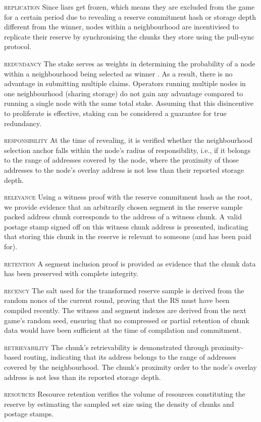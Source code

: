 \begin{labelledlist}
    \item[\textsc{replication}] Since liars get frozen, which means they are excluded from the game for a certain period due to revealing a reserve commitment hash or storage depth different from the winner, nodes within a neighbourhood are incentivised to replicate their reserve by synchronising the chunks they store using the pull-sync protocol.
%
\item[\textsc{redundancy}] The stake serves as weights in determining the probability of a node within a neighbourhood being selected as winner%
. As a result, there is no advantage in submitting multiple claims. Operators running multiple nodes in one neighbourhood (sharing storage) do not gain any advantage compared to running a single node with the same total stake. Assuming that this disincentive to proliferate is effective, staking can be considered a guarantee for true redundancy.
%
\item[\textsc{responsibility}]   At the time of revealing, it is verified whether the neighbourhood selection anchor falls within the node's radius of responsibility, i.e., if it belongs to the range of addresses covered by the node, where the proximity of those addresses to the node's overlay address is not less than their reported storage depth. 
%
\item[\textsc{relevance}]  Using a witness proof with the reserve commitment hash as the root, we provide evidence that an arbitrarily chosen segment in the reserve sample packed address chunk corresponds to the address of a witness chunk. 
A valid postage stamp signed off on this witness chunk address is presented, indicating that storing this chunk in the reserve is relevant to someone (and has been paid for). 
\item[\textsc{retention}] A segment inclusion proof is provided as evidence that the chunk data has been preserved with complete integrity. 
\item[\textsc{recency}]  The salt used for the transformed reserve sample is derived from the random noncs of the current round, proving that the RS must have been compiled recently. The witness and segment indexes are derived from the next game's random seed, ensuring that no compressed or partial retention of chunk data would have been
sufficient at the time of compilation and commitment.
\item[\textsc{retrievability}] The chunk's retrievability is demonstrated through proximity-based routing, indicating that its address belongs to the range of addresses covered by the neighbourhood. The chunk's proximity order to the node's overlay address is not less than its reported storage depth. 
\item[\textsc{resources}] Resource retention verifies the volume of resources constituting the reserve by estimating the sampled set size using the density of chunks and postage stamps. 
\end{labelledlist}


